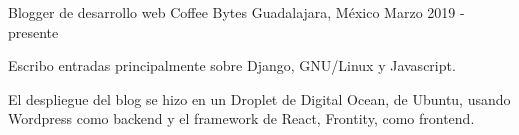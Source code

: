\begin{cventries}
  \cventry
    {Blogger de desarrollo web}
    {Coffee Bytes}
    {Guadalajara, México}
    {Marzo 2019 - presente}
    {
      \begin{cvitems}
        \item {Escribo entradas principalmente sobre Django, GNU/Linux y Javascript.}
        \item {El despliegue del blog se hizo en un Droplet de Digital Ocean, de Ubuntu, usando Wordpress como backend y el framework de React, Frontity, como frontend.}
      \end{cvitems}
    }

\end{cventries}

